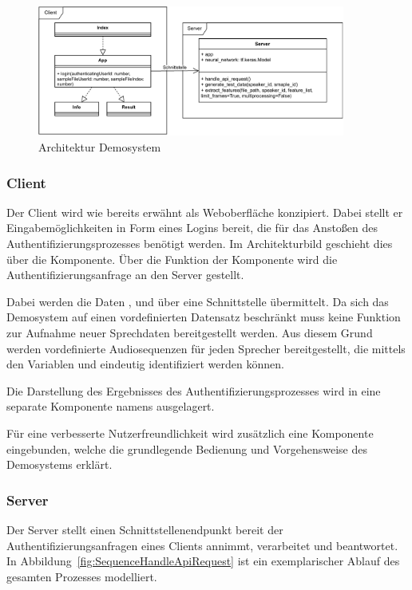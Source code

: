 \begin{figure}[H]
    \centering
    \includegraphics[width=0.9\textwidth, keepaspectratio]{images/Architektur-Demosystem}
    \caption{Architektur Demosystem}
    \label{fig:ArchitectureDemoSystem}
\end{figure}

\subsubsection{Client}
Der Client wird wie bereits erwähnt als Weboberfläche konzipiert.
Dabei stellt er Eingabemöglichkeiten in Form eines Logins bereit, die für das Anstoßen des Authentifizierungsprozesses benötigt werden.
Im Architekturbild geschieht dies über die  Komponente.
Über die  Funktion der Komponente wird die Authentifizierungsanfrage an den Server gestellt.

Dabei werden die Daten ,  und  über eine Schnittstelle übermittelt.
Da sich das Demosystem auf einen vordefinierten Datensatz beschränkt muss keine Funktion zur Aufnahme neuer Sprechdaten bereitgestellt werden.
Aus diesem Grund werden vordefinierte Audiosequenzen für jeden Sprecher bereitgestellt, die mittels den Variablen  und  eindeutig identifiziert werden können.

Die Darstellung des Ergebnisses des Authentifizierungsprozesses wird in eine separate Komponente namens  ausgelagert.

Für eine verbesserte Nutzerfreundlichkeit wird zusätzlich eine  Komponente eingebunden, welche die grundlegende Bedienung und Vorgehensweise des Demosystems erklärt.

\subsubsection{Server}
Der Server stellt einen Schnittstellenendpunkt bereit der Authentifizierungsanfragen eines Clients annimmt, verarbeitet und beantwortet.
In Abbildung~\ref{fig:SequenceHandleApiRequest} ist ein exemplarischer Ablauf des gesamten Prozesses modelliert.

